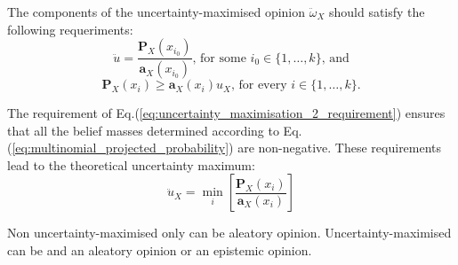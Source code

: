 The components of the uncertainty-maximised opinion $\ddot{\omega}_X$ should satisfy the following requeriments:
\begin{equation}
    \ddot{u} = \dfrac{\mathbf{P}_X(x_{i_0})}{\mathbf{a}_X(x_{i_0})}\text{, for some }i_0 \in \{1, \ldots, k\}\text{, and}
\end{equation}
\begin{equation}\label{eq:uncertainty_maximisation_2_requirement}
    \mathbf{P}_X(x_i) \geq \mathbf{a}_X(x_i)u_X\text{, for every }i \in \{1, \dots, k\}\text{.}
\end{equation}

The requirement of Eq.(\ref{eq:uncertainty_maximisation_2_requirement}) ensures that all the belief masses determined according to Eq.(\ref{eq:multinomial_projected_probability}) are non-negative. These requirements lead to the theoretical uncertainty maximum:
\begin{equation}
    \ddot{u}_X = \min\limits_i \left[\dfrac{\mathbf{P}_X(x_i)}{\mathbf{a}_X(x_i)}\right]
\end{equation}

Non uncertainty-maximised only can be aleatory opinion. Uncertainty-maximised can be and an aleatory opinion or an epistemic opinion.